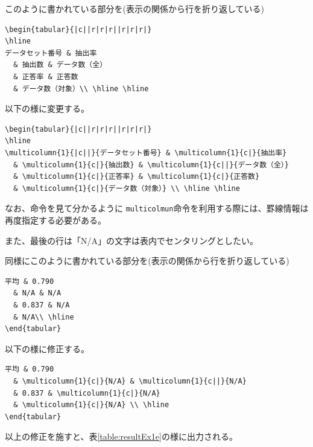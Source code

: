 このように書かれている部分を(表示の関係から行を折り返している)
\begin{breakbox}
{\small
\begin{verbatim}
\begin{tabular}{|c||r|r|r||r|r|r|}
\hline
データセット番号 & 抽出率
  & 抽出数 & データ数（全）
  & 正答率 & 正答数
  & データ数（対象）\\ \hline \hline
\end{verbatim}
}
\end{breakbox}
以下の様に変更する。
\begin{breakbox}
{\small
\begin{verbatim}
\begin{tabular}{|c||r|r|r||r|r|r|}
\hline
\multicolumn{1}{|c||}{データセット番号} & \multicolumn{1}{c|}{抽出率}
  & \multicolumn{1}{c|}{抽出数} & \multicolumn{1}{c||}{データ数（全）}
  & \multicolumn{1}{c|}{正答率} & \multicolumn{1}{c|}{正答数}
  & \multicolumn{1}{c|}{データ数（対象）} \\ \hline \hline
\end{verbatim}
}
\end{breakbox}

なお、命令を見て分かるように \verb+multicolmun+命令を利用する際には、罫線情報は再度指定する必要がある。

また、最後の行は「N/A」の文字は表内でセンタリングとしたい。

同様にこのように書かれている部分を(表示の関係から行を折り返している)
\begin{breakbox}
{\small
\begin{verbatim}
平均 & 0.790
  & N/A & N/A
  & 0.837 & N/A
  & N/A\\ \hline
\end{tabular}
\end{verbatim}
}
\end{breakbox}
以下の様に修正する。
\begin{breakbox}
{\small
\begin{verbatim}
平均 & 0.790
  & \multicolumn{1}{c|}{N/A} & \multicolumn{1}{c||}{N/A}
  & 0.837 & \multicolumn{1}{c|}{N/A}
  & \multicolumn{1}{c|}{N/A} \\ \hline
\end{tabular}
\end{verbatim}
}
\end{breakbox}

以上の修正を施すと、表\ref{table:resultEx1e}の様に出力される。

